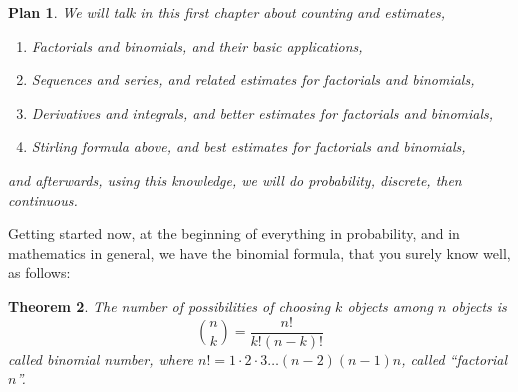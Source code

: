 \documentclass[12pt]{amsbook}
\newtheorem{theorem}{Theorem}[chapter]
\newtheorem{plan}[theorem]{Plan}
\begin{document}
\begin{plan}
We will talk in this first chapter about counting and estimates,
\begin{enumerate}
\item Factorials and binomials, and their basic applications,

\item Sequences and series, and related estimates for factorials and binomials,

\item Derivatives and integrals, and better estimates for factorials and binomials,

\item Stirling formula above, and best estimates for factorials and binomials,
\end{enumerate}
and afterwards, using this knowledge, we will do probability, discrete, then continuous.
\end{plan}

Getting started now, at the beginning of everything in probability, and in mathematics in general, we have the binomial formula, that you surely know well, as follows:


\begin{theorem}
The number of possibilities of choosing $k$ objects among $n$ objects is
$$\binom{n}{k}=\frac{n!}{k!(n-k)!}$$
called binomial number, where $n!=1\cdot2\cdot3\ldots(n-2)(n-1)n$, called ``factorial $n$''.
\end{theorem}
\end{document}
